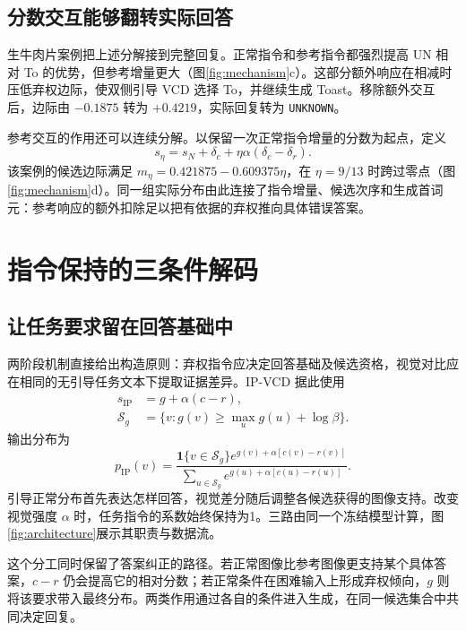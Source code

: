 \documentclass[11pt,twocolumn,a4paper]{article}
\begin{document}
\subsection{分数交互能够翻转实际回答}
生牛肉片案例把上述分解接到完整回复。正常指令和参考指令都强烈提高 UN 相对 To 的优势，但参考增量更大（图\ref{fig:mechanism}c）。这部分额外响应在相减时压低弃权边际，使双侧引导 VCD 选择 To，并继续生成 Toast。移除额外交互后，边际由 $-0.1875$ 转为 $+0.4219$，实际回复转为 \mbox{\texttt{UNKNOWN}}。

参考交互的作用还可以连续分解。以保留一次正常指令增量的分数为起点，定义
\[s_\eta=s_N+\delta_c+\eta\alpha(\delta_c-\delta_r).\]
该案例的候选边际满足 $m_\eta=0.421875-0.609375\eta$，在 $\eta=9/13$ 时跨过零点（图\ref{fig:mechanism}d）。同一组实际分布由此连接了指令增量、候选次序和生成首词元：参考响应的额外扣除足以把有依据的弃权推向具体错误答案。

\section{指令保持的三条件解码}
\subsection{让任务要求留在回答基础中}
两阶段机制直接给出构造原则：弃权指令应决定回答基础及候选资格，视觉对比应在相同的无引导任务文本下提取证据差异。IP-VCD 据此使用
\begin{equation}\begin{aligned}
s_{\mathrm{IP}}&=g+\alpha(c-r),\\
\mathcal S_g&=\{v:g(v)\ge\max_u g(u)+\log\beta\}.
\end{aligned}\label{eq:ip}\end{equation}
输出分布为
\begin{equation}
p_{\mathrm{IP}}(v)=\frac{\mathbf1\{v\in\mathcal S_g\}e^{g(v)+\alpha[c(v)-r(v)]}}{\sum_{u\in\mathcal S_g}e^{g(u)+\alpha[c(u)-r(u)]}}.
\label{eq:prob}\end{equation}
引导正常分布首先表达怎样回答，视觉差分随后调整各候选获得的图像支持。改变视觉强度 $\alpha$ 时，任务指令的系数始终保持为1。三路由同一个冻结模型计算，图\ref{fig:architecture}展示其职责与数据流。

这个分工同时保留了答案纠正的路径。若正常图像比参考图像更支持某个具体答案，$c-r$ 仍会提高它的相对分数；若正常条件在困难输入上形成弃权倾向，$g$ 则将该要求带入最终分布。两类作用通过各自的条件进入生成，在同一候选集合中共同决定回复。


\end{document}
